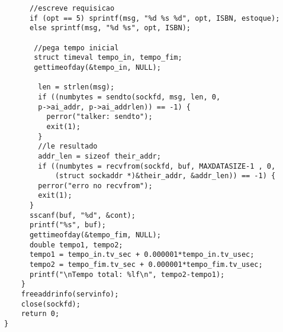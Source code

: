 \documentclass[11pt, brazil]{article} %
\begin{document}
\begin{verbatim}
      //escreve requisicao
      if (opt == 5) sprintf(msg, "%d %s %d", opt, ISBN, estoque);
      else sprintf(msg, "%d %s", opt, ISBN);  
		
       //pega tempo inicial
       struct timeval tempo_in, tempo_fim;
       gettimeofday(&tempo_in, NULL);
		
        len = strlen(msg);
        if ((numbytes = sendto(sockfd, msg, len, 0,
        p->ai_addr, p->ai_addrlen)) == -1) {
          perror("talker: sendto");
          exit(1);
        }
        //le resultado
        addr_len = sizeof their_addr;
        if ((numbytes = recvfrom(sockfd, buf, MAXDATASIZE-1 , 0,
	        (struct sockaddr *)&their_addr, &addr_len)) == -1) {
        perror("erro no recvfrom");
        exit(1);
      }    		
      sscanf(buf, "%d", &cont);    		    
      printf("%s", buf);
      gettimeofday(&tempo_fim, NULL);
      double tempo1, tempo2;
      tempo1 = tempo_in.tv_sec + 0.000001*tempo_in.tv_usec;
      tempo2 = tempo_fim.tv_sec + 0.000001*tempo_fim.tv_usec;
      printf("\nTempo total: %lf\n", tempo2-tempo1);
    }
    freeaddrinfo(servinfo);
    close(sockfd);
    return 0;
}
\end{verbatim}
\end{document}

